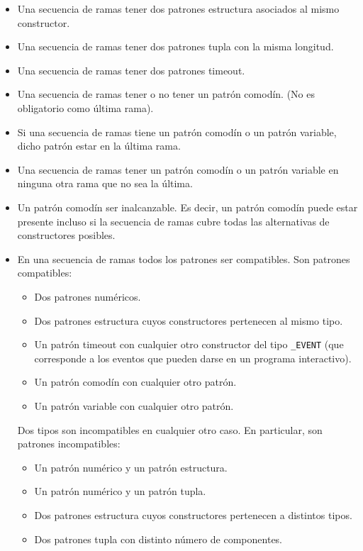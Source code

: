 \documentclass{article}
\begin{document}
\begin{itemize}
\item Una secuencia de ramas \NOPUEDE tener dos patrones estructura asociados al mismo constructor.
\item Una secuencia de ramas \NOPUEDE tener dos patrones tupla con la misma longitud.
\item Una secuencia de ramas \NOPUEDE tener dos patrones timeout.
\item Una secuencia de ramas \PUEDE tener o no tener un patr\'on comod\'in. (No es obligatorio como \'ultima rama).
\item Si una secuencia de ramas tiene un patr\'on comod\'in o un patr\'on variable, dicho patr\'on \DEBE estar en la \'ultima rama.
\item Una secuencia de ramas \NOPUEDE tener un patr\'on comod\'in o un patr\'on variable en ninguna otra rama que no sea la \'ultima.
\item Un patr\'on comod\'in \PUEDE ser inalcanzable.
      Es decir, un patr\'on comod\'in puede estar presente incluso si la secuencia de ramas
      cubre todas las alternativas de constructores posibles.
\item En una secuencia de ramas todos los patrones \DEBEN ser compatibles.
      Son patrones compatibles:
      \begin{itemize}
      \item Dos patrones num\'ericos.
      \item Dos patrones estructura cuyos constructores pertenecen al mismo tipo.
      \item Un patr\'on timeout con cualquier otro constructor del tipo \texttt{\_EVENT}
            (que corresponde a los eventos que pueden darse en un programa interactivo).
      \item Un patr\'on comod\'in con cualquier otro patr\'on.
      \item Un patr\'on variable con cualquier otro patr\'on.
      \end{itemize}
      Dos tipos son incompatibles en cualquier otro caso. En particular, son patrones incompatibles:
      \begin{itemize}
      \item Un patr\'on num\'erico y un patr\'on estructura.
      \item Un patr\'on num\'erico y un patr\'on tupla.
      \item Dos patrones estructura cuyos constructores pertenecen a distintos tipos.
      \item Dos patrones tupla con distinto n\'umero de componentes.

\end{itemize}
\end{itemize}
\end{document}
